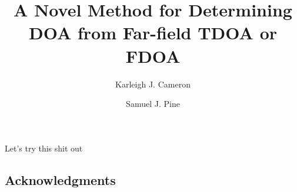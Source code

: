 \documentclass[12pt]{amsart}
\theoremstyle{definition}
\theoremstyle{remark}
\begin{document}
\title{A Novel Method for Determining DOA from Far-field TDOA or FDOA}
\author{Karleigh J. Cameron }
\author{Samuel J. Pine } %




\maketitle


Let's try this shit out













\subsection{Acknowledgments}



\end{document}

